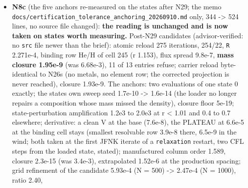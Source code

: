 \documentclass[english,a4paper]{my_memo}
\begin{document}
\begin{itemize}
  below). \textbf{Advisor}: \texttt{steady\_species\_rows\_tests.f90} referenced
  \texttt{element\_ratio\_gate} through \texttt{element\_inventory}, which since N28 imports
  it with \texttt{use,\ only} and does not re-export it, so the suite would not
  build (N28\textquotesingle s validation did not include this suite; the advisor\textquotesingle s did not
  either): one \texttt{use\ element\_census,\ only:\ element\_ratio\_gate} line added by
  the advisor; rebuild warning-free (md5 \texttt{a9627a14}), \texttt{element\_operator}
  14/0, \texttt{certification} 42/0, \texttt{steady\_species\_rows} 189/0,
  \texttt{krylov\_and\_dogleg} 174/0; one \texttt{percent} fixed. Reported: the metal arm\textquotesingle s
  counter-flux is closed on hydrogen but not on momentum or internal energy
  (a trace approximation, named); \texttt{element\_census\_verify} gates the element
  ratios and only reports the mass closure (the 6.4e-3 state passed every
  gate it has): whether it should gate is a decision.
\item
  \textbf{N8c} (the five anchors re-measured on the states after N29; the memo
  \texttt{docs/certification\_tolerance\_anchoring\_20260910.md} only, 344 -\textgreater{} 524
  lines, no source file changed): \textbf{the reading is unchanged and is now
  taken on states worth measuring.} Post-N29 candidates (advisor-verified:
  no \texttt{src} file newer than the brief): atomic reload 275 iterations, 254/22,
  \texttt{\textbar{}\textbar{}R\textbar{}\textbar{}} 2.271e-4, binding row He/H of cell 245 (r 1.153), flux spread
  9.8e-7, \textbf{mass closure 1.95e-9} (was 6.68e-3), 11 of 13 entries refuse;
  carrier reload byte-identical to N26\textquotesingle s (no metals, no element row; the
  corrected projection is never reached), closure 1.93e-9. The anchors: two
  evaluations of one state 0 exactly; the state\textquotesingle s own sweep seed 1.7e-10 -\textgreater{}
  1.6e-14 (the loader no longer repairs a composition whose mass missed the
  density), closure floor 5e-19; state-perturbation amplification 1.2e3 to
  2.0e3 at r \textless{} 1.01 and 0.4 to 0.7 elsewhere; derivative: a clean V at the
  base (7.6e-8), the PLATEAU at 6.6e-5 at the binding cell stays (smallest
  resolvable row 3.9e-8 there, 6.5e-9 in the wind; both taken at the first
  JFNK iterate of a \texttt{relaxation} restart, two CFL steps from the loaded
  state, stated); manufactured column order 1.589, closure 2.3e-15 (was
  3.4e-3), extrapolated 1.52e-6 at the production spacing; grid refinement
  of the candidate 5.93e-4 (N = 500) -\textgreater{} 2.47e-4 (N = 1000), ratio 2.40,

\end{itemize}
\end{document}
